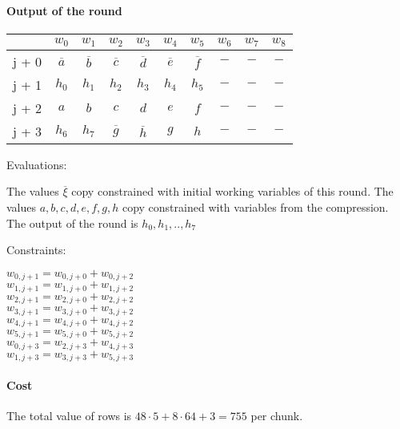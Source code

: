 \paragraph{Output of the round}\label{sha-out}
\begin{center}
    \begin{tabular}{ c|c|c|c|c|c|c|c|c|c }
        & $w_0$  & $w_1$  & $w_2$  & $w_3$  & $w_4$  & $w_5$ & $w_6$ & $w_7$ & $w_8$  \\
        \hline
        j + 0 & $\overline{a}$  & $\overline{b}$ & $\overline{c}$ & $\overline{d}$ & $\overline{e}$ & $\overline{f}$ & $-$ & $-$ & $-$ \\
        j + 1 & $h_0$ & $h_1$ & $h_2$ & $h_3$  & $h_4$  & $h_5$   & $-$ & $-$  & $-$   \\
        j + 2 & $a$ & $b$ & $c$ & $d$ & $e$ & $f$ & $-$ & $-$ & $-$\\
        j + 3 & $h_6$ & $h_7$ & $\overline{g}$ & $\overline{h}$ & $g$ & $h$ & $-$ & $-$ & $-$\\
    \end{tabular}
\end{center}
Evaluations:
\begin{center}
The values $\overline{\xi}$ copy constrained with initial working variables of this round.
The values  $a, b, c, d, e, f, g, h$ copy constrained with variables from the compression.
The output of the round is $h_0, h_1, .., h_7$
\end{center}
Constraints:
\begin{center}
    $w_{0, j + 1} = w_{0, j + 0} + w_{0, j + 2}$ \\
    $w_{1, j + 1} = w_{1, j + 0} + w_{1, j + 2}$ \\
    $w_{2, j + 1} = w_{2, j + 0} + w_{2, j + 2}$ \\
    $w_{3, j + 1} = w_{3, j + 0} + w_{3, j + 2}$ \\
    $w_{4, j + 1} = w_{4, j + 0} + w_{4, j + 2}$ \\
    $w_{5, j + 1} = w_{5, j + 0} + w_{5, j + 2}$ \\
    $w_{0, j + 3} = w_{2, j + 3} + w_{4, j + 3}$ \\
    $w_{1, j + 3} = w_{3, j + 3} + w_{5, j + 3}$ \\
\end{center}



\paragraph{Cost}
The total value of rows is $48 \cdot 5 + 8 \cdot 64 + 3 = 755$ per chunk.


